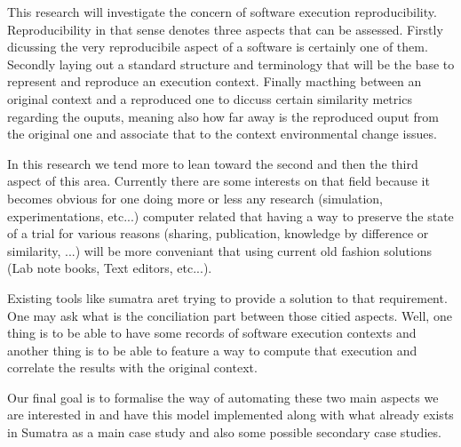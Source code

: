 

This research will investigate the concern of software execution reproducibility.
Reproducibility in that sense denotes three aspects that can be assessed. Firstly dicussing the very
reproducibile aspect of a software is certainly one of them. Secondly laying out a standard structure and
 terminology that will be the base to represent and reproduce an execution context. Finally
 macthing between an original context and a reproduced one to diccuss certain similarity metrics regarding
the ouputs, meaning also how far away is the reproduced ouput from the original one and associate that to
the context environmental change issues.

In this research we tend more to lean toward the second and then the third aspect of this area.
Currently there are some interests on that field because it becomes obvious for one doing more or 
less any research (simulation, experimentations, etc...) computer related that having a way to preserve
the state of a trial for various reasons (sharing, publication, knowledge by difference or similarity, ...)
will be more conveniant that using current old fashion solutions (Lab note books, Text editors, etc...).

Existing tools like sumatra aret trying to provide a solution to that requirement.
One may ask what is the conciliation part between those citied aspects. Well, one thing is to be
able to have some records of software execution contexts and another thing is to be able to feature
a way to compute that execution and correlate the results with the original context.

Our final goal is to formalise the way of automating these two main aspects we are interested in and 
have this model implemented along with what already exists in Sumatra as a main case study and also
some possible secondary case studies.
